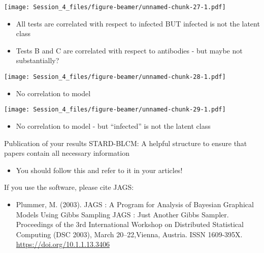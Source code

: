 \documentclass[
  ignorenonframetext,
  aspectratio=169,
]{beamer}
\providecommand{\tightlist}{%
  \setlength{\itemsep}{0pt}\setlength{\parskip}{0pt}}
\begin{document}
\begin{frame}
\scriptsize\texttt{[image: Session\_4\_files/figure-beamer/unnamed-chunk-27-1.pdf]}
\normalsize

\pause

\begin{itemize}
\item
  All tests are correlated with respect to infected BUT infected is not
  the latent class
\item
  Tests B and C are correlated with respect to antibodies - but maybe
  not substantially?
\end{itemize}
\end{frame}

\begin{frame}
\scriptsize\texttt{[image: Session\_4\_files/figure-beamer/unnamed-chunk-28-1.pdf]}
\normalsize

\pause

\begin{itemize}
\tightlist
\item
  No correlation to model
\end{itemize}
\end{frame}

\begin{frame}
\scriptsize\texttt{[image: Session\_4\_files/figure-beamer/unnamed-chunk-29-1.pdf]}
\normalsize

\pause

\begin{itemize}
\tightlist
\item
  No correlation to model - but ``infected'' is not the latent class
\end{itemize}
\end{frame}

\begin{frame}{Publication of your results}
\protect\hypertarget{publication-of-your-results}{}
STARD-BLCM: A helpful structure to ensure that papers contain all
necessary information

\begin{itemize}
\tightlist
\item
  You should follow this and refer to it in your articles!
\end{itemize}

\pause

If you use the software, please cite JAGS:

\begin{itemize}
\tightlist
\item
  Plummer, M. (2003). JAGS : A Program for Analysis of Bayesian
  Graphical Models Using Gibbs Sampling JAGS : Just Another Gibbs
  Sampler. Proceedings of the 3rd International Workshop on Distributed
  Statistical Computing (DSC 2003), March 20--22,Vienna, Austria. ISSN
  1609-395X. \url{https://doi.org/10.1.1.13.3406}
\end{itemize}
\end{frame}
\end{document}
